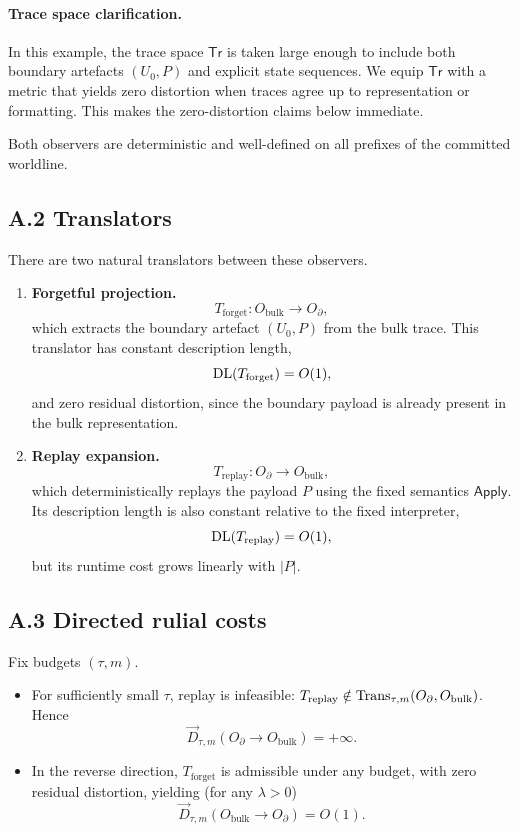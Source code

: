 \documentclass{aion}
\newcommand{\Tr}{\mathsf{Tr}}
\newcommand{\Apply}{\mathsf{Apply}}
\begin{document}
\paragraph{Trace space clarification.}
In this example, the trace space $\Tr$ is taken large enough to include both boundary artefacts $(U_0,P)$ and
explicit state sequences.
We equip $\Tr$ with a metric that yields zero distortion when traces agree up to representation or formatting.
This makes the zero-distortion claims below immediate.

Both observers are deterministic and well-defined on all prefixes of the committed worldline.

\subsection*{A.2 Translators}

There are two natural translators between these observers.

\begin{enumerate}
\item \textbf{Forgetful projection.}
\[
T_{\mathrm{forget}} : O_{\mathrm{bulk}} \to O_\partial,
\]
which extracts the boundary artefact $(U_0,P)$ from the bulk trace. This translator has constant
description length,
\[
\operatorname{DL}(T_{\mathrm{forget}}) = O(1),
\]
and zero residual distortion, since the boundary payload is already present in the bulk
representation.

\item \textbf{Replay expansion.}
\[
T_{\mathrm{replay}} : O_\partial \to O_{\mathrm{bulk}},
\]
which deterministically replays the payload $P$ using the fixed semantics
$\Apply$. Its description length is also constant relative to the fixed interpreter,
\[
\operatorname{DL}(T_{\mathrm{replay}}) = O(1),
\]
but its runtime cost grows linearly with $|P|$.
\end{enumerate}

\subsection*{A.3 Directed rulial costs}

Fix budgets $(\tau,m)$.

\begin{itemize}
\item For sufficiently small $\tau$, replay is infeasible:
$T_{\mathrm{replay}} \notin \operatorname{Trans}_{\tau,m}(O_\partial,O_{\mathrm{bulk}})$.
Hence
\[
\vec{D}_{\tau,m}(O_\partial \to O_{\mathrm{bulk}}) = +\infty .
\]

\item In the reverse direction, $T_{\mathrm{forget}}$ is admissible under any budget, with zero
residual distortion, yielding (for any $\lambda>0$)
\[
\vec{D}_{\tau,m}(O_{\mathrm{bulk}} \to O_\partial) = O(1).
\]
\end{itemize}
\end{document}
